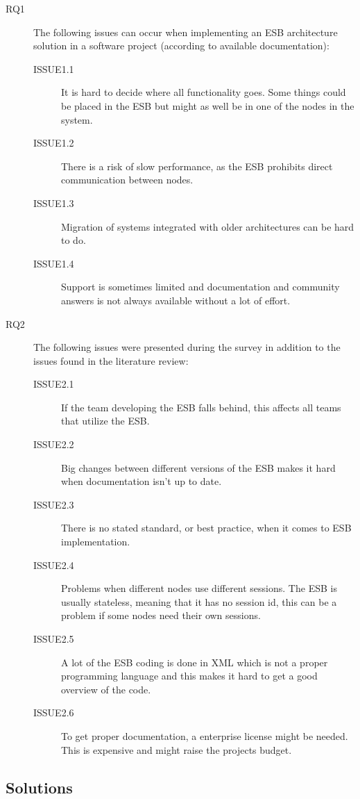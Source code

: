 \documentclass{llncs}
\begin{document}
\begin{description}

\item[RQ1] The following issues can occur when implementing an ESB architecture solution in a software project (according to available documentation):
\begin{description}
\item[ISSUE1.1] It is hard to decide where all functionality goes. Some things could be placed in the ESB but might as well be in one of the nodes in the system.
\item[ISSUE1.2] There is a risk of slow performance, as the ESB prohibits direct communication between nodes.
\item[ISSUE1.3] Migration of systems integrated with older architectures can be hard to do.
\item[ISSUE1.4] Support is sometimes limited and documentation and community answers is not always available without a lot of effort.
\end{description}

\item[RQ2] The following issues were presented during the survey in addition to the issues found in the literature review:
\begin{description}
\item[ISSUE2.1] If the team developing the ESB falls behind, this affects all teams that utilize the ESB.
\item[ISSUE2.2] Big changes between different versions of the ESB makes it hard when documentation isn't up to date.
\item[ISSUE2.3] There is no stated standard, or best practice, when it comes to ESB implementation.
\item[ISSUE2.4] Problems when different nodes use different sessions. The ESB is usually stateless, meaning that it has no session id, this can be a problem if some nodes need their own sessions.
\item[ISSUE2.5] A lot of the ESB coding is done in XML which is not a proper programming language and this makes it hard to get a good overview of the code. 
\item[ISSUE2.6] To get proper documentation, a enterprise license might be needed. This is expensive and might raise the projects budget.
\end{description}
\end{description}

\subsection{Solutions}
\end{document}
